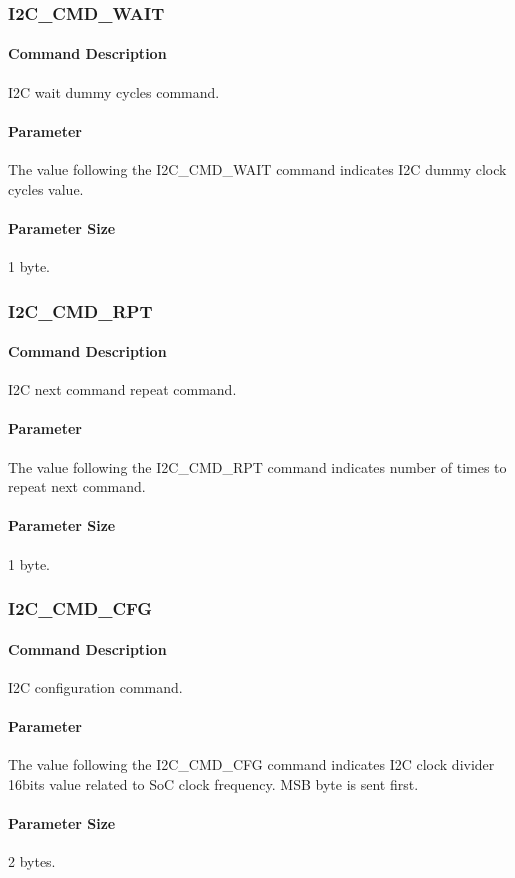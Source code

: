 \subsubsection{I2C\_CMD\_WAIT}
\paragraph{Command Description}
I2C wait dummy cycles command.
\paragraph{Parameter}
The value following the I2C\_CMD\_WAIT command indicates I2C dummy clock cycles value.
\paragraph{Parameter Size}
1 byte.


\subsubsection{I2C\_CMD\_RPT}
\paragraph{Command Description}
I2C next command repeat command.
\paragraph{Parameter}
The value following the I2C\_CMD\_RPT command indicates number of times to repeat next command.
\paragraph{Parameter Size}
1 byte.


\subsubsection{I2C\_CMD\_CFG}
\paragraph{Command Description}
I2C configuration command.
\paragraph{Parameter}
The value following the I2C\_CMD\_CFG command indicates I2C clock divider 16bits value related to SoC clock frequency. MSB byte is sent first.
\paragraph{Parameter Size}
2 bytes.



